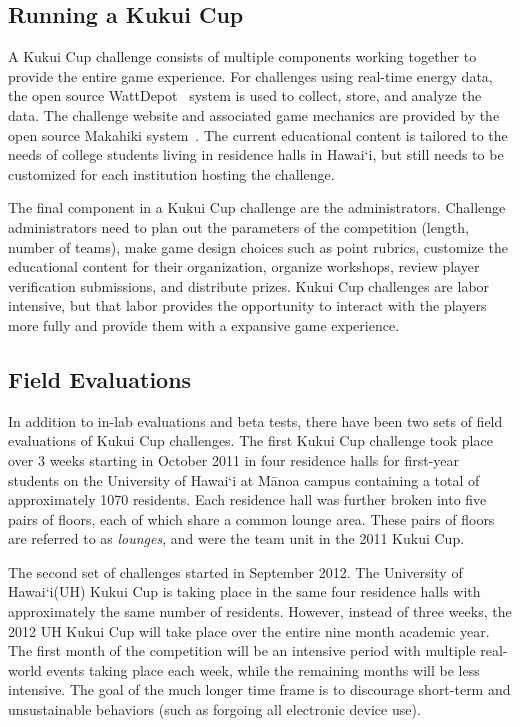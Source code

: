 \documentclass{sigchi}
\newcommand{\Hawaii}{Hawai`i\xspace}
\newcommand{\Manoa}{M\=anoa\xspace}
\begin{document}
\subsection{Running a Kukui Cup}

A Kukui Cup challenge consists of multiple components working together to provide the entire game experience. For challenges using real-time energy data, the open source WattDepot~\cite{csdl2-10-05} system is used to collect, store, and analyze the data. The challenge website and associated game mechanics are provided by the open source Makahiki system~\cite{csdl2-11-07}. The current educational content is tailored to the needs of college students living in residence halls in \Hawaii, but still needs to be customized for each institution hosting the challenge.

The final component in a Kukui Cup challenge are the administrators. Challenge administrators need to plan out the parameters of the competition (length, number of teams), make game design choices such as point rubrics, customize the educational content for their organization, organize workshops, review player verification submissions, and distribute prizes. Kukui Cup challenges are labor intensive, but that labor provides the opportunity to interact with the players more fully and provide them with a expansive game experience.

\subsection{Field Evaluations}

In addition to in-lab evaluations and beta tests, there have been two sets of field evaluations of Kukui Cup challenges. The first Kukui Cup challenge took place over 3 weeks starting in October 2011 in four residence halls for first-year students on the University of \Hawaii at \Manoa campus containing a total of approximately 1070 residents. Each residence hall was further broken into five pairs of floors, each of which share a common lounge area. These pairs of floors are referred to as \emph{lounges}, and were the team unit in the 2011 Kukui Cup.

The second set of challenges started in September 2012. The University of \Hawaii (UH) Kukui Cup is taking place in the same four residence halls with approximately the same number of residents. However, instead of three weeks, the 2012 UH Kukui Cup will take place over the entire nine month academic year. The first month of the competition will be an intensive period with multiple real-world events taking place each week, while the remaining months will be less intensive. The goal of the much longer time frame is to discourage short-term and unsustainable behaviors (such as forgoing all electronic device use). 
\end{document}
